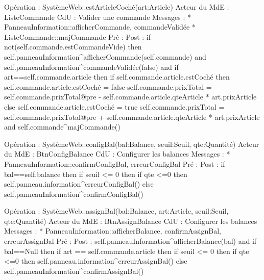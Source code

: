 Opération : SystèmeWeb::estArticleCoché(art:Article)
Acteur du MdE : ListeCommande
CdU : Valider une commande
Messages : 
* PanneauInformation::{afficherCommande, commandeValidée}
* ListeCommande::{majCommande}
Pré :
Post :  
if not(self.commande.estCommandeVide) then
                self.panneauInformation^afficherCommande(self.commande) 
and
                self.panneauInformation^commandeValidée(false) 
and
                if art==self.commande.article then
                        if self.commande.article.estCoché then
                                self.commande.article.estCoché = false
                                self.commande.prixTotal = self.commande.prixTotal@pre - 
self.commande.article.qteArticle * art.prixArticle
                        else 
                                self.commande.article.estCoché = true
                                self.commande.prixTotal = self.commande.prixTotal@pre + 
self.commande.article.qteArticle * art.prixArticle
                        and 
                        self.commande^majCommande()




Opération : SystèmeWeb::configBal(bal:Balance, seuil:Seuil, qte:Quantité)
Acteur du MdE : BtnConfigBalance 
CdU : Configurer les balances
Messages : 
* PanneauInformation::{confirmConfigBal, erreurConfigBal}
Pré :
Post :  
        if bal==self.balance then
                if seuil <= 0 then
                        if qte <=0 then
                                self.panneau.information^erreurConfigBal()
        else
                self.panneauInformation^confirmConfigBal()


Opération : SystèmeWeb::assignBal(bal:Balance, art:Article, seuil:Seuil, qte:Quantité)
Acteur du MdE : BtnAssignBalance 
CdU : Configurer les balances
Messages :
* PanneauInformation::{afficherBalance, confirmAssignBal, erreurAssignBal}
Pré :
Post : 
        self.panneauInformation^afficherBalance(bal)
and
        if bal==Null then
                if art == self.commande.article then
                        if seuil <= 0 then
                                if qte <=0 then
                                        self.panneau.information^erreurAssignBal()
        else
                self.panneauInformation^confirmAssignBal()
